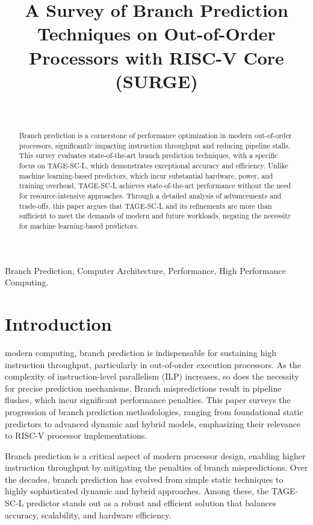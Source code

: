 \documentclass[10pt,journal,compsoc]{IEEEtran}
\begin{document}
\title{A Survey of Branch Prediction Techniques on Out-of-Order Processors with RISC-V Core (SURGE)}
\author{\\
}
\maketitle

    \begin{abstract}
        Branch prediction is a cornerstone of performance optimization in modern out-of-order processors, significantly impacting instruction throughput and reducing pipeline stalls. This survey evaluates state-of-the-art branch prediction techniques, with a specific focus on TAGE-SC-L, which demonstrates exceptional accuracy and efficiency. Unlike machine learning-based predictors, which incur substantial hardware, power, and training overhead, TAGE-SC-L achieves state-of-the-art performance without the need for resource-intensive approaches. Through a detailed analysis of advancements and trade-offs, this paper argues that TAGE-SC-L and its refinements are more than sufficient to meet the demands of modern and future workloads, negating the necessity for machine learning-based predictors.
    \end{abstract}
\begin{IEEEkeywords}
Branch Prediction, Computer Architecture, Performance, High Performance Computing.
\end{IEEEkeywords}

    \section{Introduction}
     modern computing, branch prediction is indispensable for sustaining high instruction throughput, 
    particularly in out-of-order execution processors. As the complexity of instruction-level parallelism (ILP) 
    increases, so does the necessity for precise prediction mechanisms. Branch mispredictions result in pipeline 
    flushes, which incur significant performance penalties. This paper surveys the progression of branch prediction 
    methodologies, ranging from foundational static predictors to advanced dynamic and hybrid models, emphasizing 
    their relevance to RISC-V processor implementations.
    
    Branch prediction is a critical aspect of modern processor design, enabling higher instruction throughput by mitigating the penalties of branch mispredictions. Over the decades, branch prediction has evolved from simple static techniques to highly sophisticated dynamic and hybrid approaches. Among these, the TAGE-SC-L predictor stands out as a robust and efficient solution that balances accuracy, scalability, and hardware efficiency.
\end{document}
